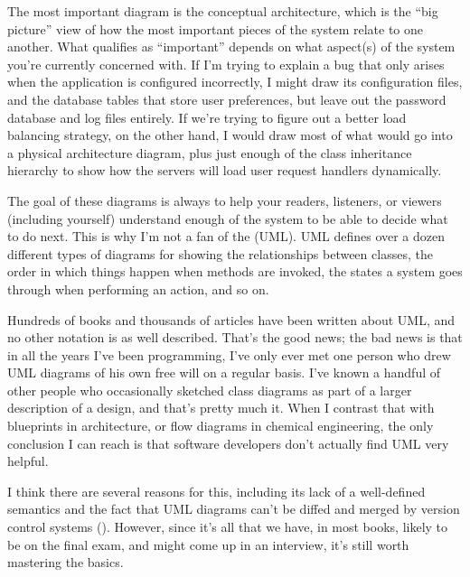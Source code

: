 \documentclass{report}
\begin{document}
The most important diagram is the conceptual architecture, which is
the ``big picture'' view of how the most important pieces of the
system relate to one another.  What qualifies as ``important'' depends
on what aspect(s) of the system you're currently concerned with.  If
I'm trying to explain a bug that only arises when the application is
configured incorrectly, I might draw its configuration files, and the
database tables that store user preferences, but leave out the
password database and log files entirely.  If we're trying to figure
out a better load balancing strategy, on the other hand, I would draw
most of what would go into a physical architecture diagram, plus just
enough of the class inheritance hierarchy to show how the servers will
load user request handlers dynamically.

The goal of these diagrams is always to help your readers, listeners,
or viewers (including yourself) understand enough of the system to be
able to decide what to do next.  This is why I'm not a fan of the
 (UML).  UML defines over a dozen
different types of diagrams for showing the relationships between
classes, the order in which things happen when methods are invoked,
the states a system goes through when performing an action, and so on.

Hundreds of books and thousands of articles have been written about
UML, and no other notation is as well described.  That's the good
news; the bad news is that in all the years I've been programming,
I've only ever met one person who drew UML diagrams of his own free
will on a regular basis.  I've known a handful of other people who
occasionally sketched class diagrams as part of a larger description
of a design, and that's pretty much it.  When I contrast that with
blueprints in architecture, or flow diagrams in chemical engineering,
the only conclusion I can reach is that software developers don't
actually find UML very helpful.

I think there are several reasons for this, including its lack of a
well-defined semantics and the fact that UML diagrams can't be diffed
and merged by version control systems ().
However, since it's all that we have, in most books, likely to be on
the final exam, and might come up in an interview, it's still worth
mastering the basics.

\end{document}
